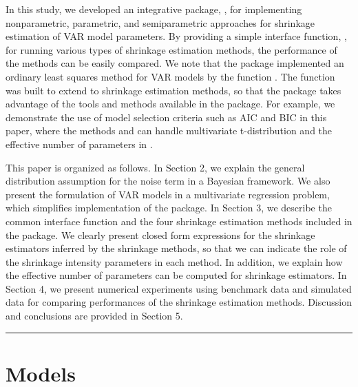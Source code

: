 \documentclass[
]{jss}
\begin{document}
In this study, we developed an integrative  package,
, for implementing nonparametric, parametric, and
semiparametric approaches for shrinkage estimation of VAR model
parameters. By providing a simple interface function,
, for running various types of shrinkage estimation
methods, the performance of the methods can be easily compared. We note
that the package  implemented an ordinary least squares method
for VAR models by the function . The function
 was built to extend  to shrinkage
estimation methods, so that the  package takes advantage
of the tools and methods available in the  package. For
example, we demonstrate the use of model selection criteria such as AIC
and BIC in this paper, where the methods  and
 can handle multivariate t-distribution and the effective
number of parameters in .

This paper is organized as follows. In Section 2, we explain the general
distribution assumption for the noise term in a Bayesian framework. We
also present the formulation of VAR models in a multivariate regression
problem, which simplifies implementation of the package. In Section 3,
we describe the common interface function and the four shrinkage
estimation methods included in the package. We clearly present closed
form expressions for the shrinkage estimators inferred by the shrinkage
methods, so that we can indicate the role of the shrinkage intensity
parameters in each method. In addition, we explain how the effective
number of parameters can be computed for shrinkage estimators. In
Section 4, we present numerical experiments using benchmark data and
simulated data for comparing performances of the shrinkage estimation
methods. Discussion and conclusions are provided in Section 5.

\begin{center}\rule{0.5\linewidth}{\linethickness}\end{center}

\hypertarget{models}{%
\section{Models}\label{models}}
\end{document}
